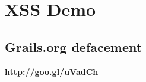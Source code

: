 
\section{XSS Demo}

\subsection{Grails.org defacement}

{
\begin{frame}[plain]
  \begin{center}
    \Huge\bfseries
    http://goo.gl/uVadCh
    \vfill
  \end{center}
\end{frame}
}


{
\begin{frame}[plain]
\end{frame}
}
